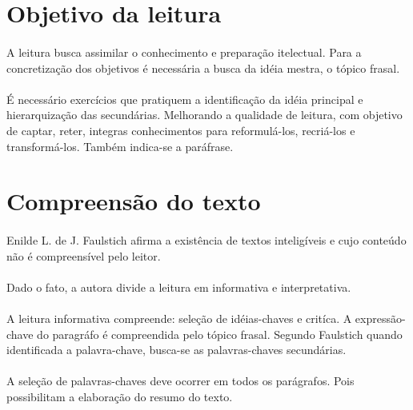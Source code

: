 \section{Objetivo da leitura}

\paragraph{}
A leitura busca assimilar o conhecimento e preparação itelectual. Para a concretização dos objetivos é necessária a busca da idéia mestra, o tópico frasal.

\paragraph{}
É necessário exercícios que pratiquem a identificação da idéia principal e hierarquização das secundárias. Melhorando a qualidade de leitura, com objetivo de captar, reter, integras conhecimentos para reformulá-los, recriá-los e transformá-los. 
Também indica-se a paráfrase.

\section{Compreensão do texto}

\paragraph{}
Enilde L. de J. Faulstich afirma a existência de textos inteligíveis e cujo conteúdo não é compreensível pelo leitor.

\paragraph{}
Dado o fato, a autora divide a leitura em informativa e interpretativa.

\paragraph{}
A leitura informativa compreende: seleção de idéias-chaves e critíca. A expressão-chave do paragráfo é compreendida pelo tópico frasal. Segundo Faulstich quando identificada a palavra-chave, busca-se as palavras-chaves secundárias.
\paragraph{}
A seleção de palavras-chaves deve ocorrer em todos os parágrafos. Pois possibilitam a elaboração do resumo do texto.

